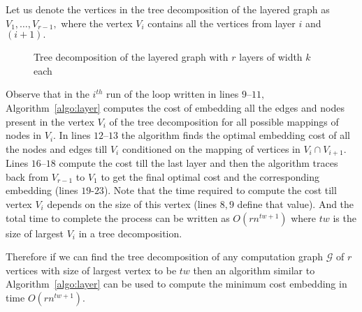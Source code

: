 \documentclass[journal]{IEEEtran}
\newcommand{\compgraph}{\mathcal{G}}
\begin{document}
Let us denote the vertices in the tree decomposition of the layered
graph as $V_1,\ldots,V_{r-1},$ where the vertex $V_i$ contains all the
vertices from layer $i$ and $(i+1).$
\begin{figure}[tbp]
  \centering
{}
  \caption{Tree decomposition of the layered graph with $r$ layers of
    width $k$ each}
  \label{fig:layertree}
\end{figure}
Observe that in the $i^{th}$ run of the loop written in lines
$9$--$11,$ Algorithm~\ref{algo:layer} computes the cost of embedding
all the edges and nodes present in the vertex $V_i$ of the tree
decomposition for all possible mappings of nodes in $V_i.$ In lines
$12$--$13$ the algorithm finds the optimal embedding cost of all the
nodes and edges till $V_i$ conditioned on the mapping of vertices in
$V_i \cap V_{i+1}.$ Lines $16$--$18$ compute the cost till the last
layer and then the algorithm traces back from $V_{r-1}$ to $V_1$ to
get the final optimal cost and the corresponding embedding (lines
$19$-$23$). Note that the time required to compute the cost till
vertex $V_i$ depends on the size of this vertex (lines $8,9$ define
that value). And the total time to complete the process can be written
as $O(rn^{tw+1})$ where $tw$ is the size of largest $V_i$ in a tree
decomposition.

Therefore if we can find the tree decomposition of any computation
graph $\compgraph$ of $r$ vertices with size of largest vertex to be
$tw$ then an algorithm similar to Algorithm~\ref{algo:layer} can be
used to compute the minimum cost embedding in time $O(rn^{tw+1}).$
\end{document}
